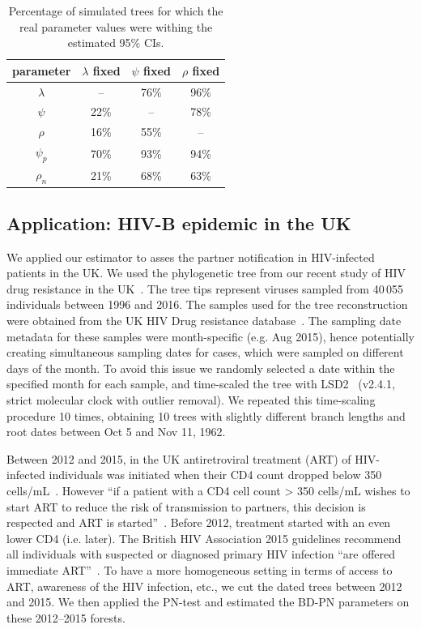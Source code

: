\documentclass[a4paper,10pt]{article}
\begin{document}
 \begin{table}[!h]\centering
\small
\caption{Percentage of simulated trees for which the real parameter values were withing the estimated 95\% CIs. \smallskip}
\begin{tabular}{c|ccc}
\textbf{parameter} & \textbf{$\lambda$ fixed} & \textbf{$\psi$ fixed} & \textbf{$\rho$ fixed} \\
\toprule 
 $\lambda$ & -- &  76\% & 96\% \\
 $\psi$ & 22\% & -- & 78\% \\
 $\rho$ & 16\% & 55\%  & -- \\
 $\psi_p$ & 70\% & 93\% & 94\% \\
 $\rho_n$ & 21\% & 68\% & 63\% \\
\bottomrule
\end{tabular}
\label{tbl:ci}
\end{table}


\subsection{Application: HIV-B epidemic in the UK}
We applied our estimator to asses the partner notification in HIV-infected patients in the UK. We used the phylogenetic tree from our recent study of HIV drug resistance in the UK~\citep{zhukovaModelingDrugResistance2023}. The tree tips represent viruses sampled from 40\,055 individuals between 1996 and 2016. The samples used for the tree reconstruction were obtained from the UK HIV Drug resistance database~\citep{Dunn2007}. The sampling date metadata for these samples were month-specific (e.g. Aug 2015), hence potentially creating simultaneous sampling dates for cases, which were sampled on different days of the month. To avoid this issue we randomly selected a date within the specified month for each sample, and time-scaled the tree with LSD2~\citep{To2016} (v2.4.1, strict molecular clock with outlier removal). We repeated this time-scaling procedure 10 times, obtaining 10 trees with slightly different branch lengths and root dates between Oct 5 and Nov 11, 1962.

Between 2012 and 2015, in the UK antiretroviral treatment (ART) of HIV-infected individuals  was initiated when their CD4 count dropped below 350 cells/mL~\citep{williamsBritishHIVAssociation2012}. However ``if a patient with a CD4 cell count > 350 cells/mL wishes to start ART to reduce the risk of transmission to partners, this decision is respected and ART is started''~\citep{williamsBritishHIVAssociation2012}. Before 2012, treatment started with an even lower CD4 (i.e. later). The British HIV Association 2015 guidelines recommend all individuals with suspected or diagnosed primary HIV infection ``are offered immediate ART''~\citep{churchillBritishHIVAssociation2016}. To have a more homogeneous setting in terms of access to ART, awareness of the HIV infection, etc., we cut the dated trees between 2012 and 2015. We then applied the PN-test and estimated the BD-PN parameters on these 2012--2015 forests. 
\end{document}

